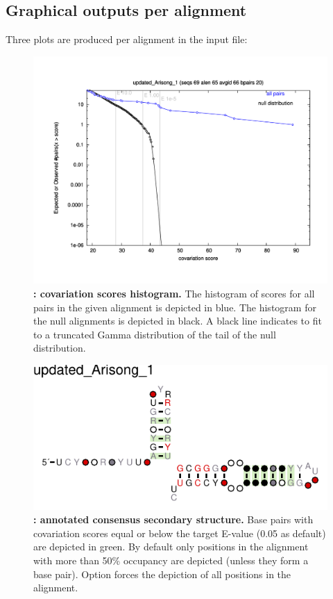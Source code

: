 \subsection{Graphical outputs per alignment}
Three plots are produced per alignment in the input file: 

\begin{figure}
  \includegraphics[scale=0.50]{Arisong_his.pdf} 
\caption{\small\textbf{:
    covariation scores histogram.}  The histogram of scores for all
  pairs in the given alignment is depicted in blue. The histogram for
  the null alignments is depicted in black. A black line indicates to
  fit to a truncated Gamma distribution of the tail of the null
  distribution.}
\label{fig:histogram}
\end{figure}

\begin{figure}
  \includegraphics[scale=1.5]{Arisong_R2R.pdf} 
\caption{\small\textbf{:
    annotated consensus secondary structure.} Base pairs with
  covariation scores equal or below the target E-value (0.05 as
  default) are depicted in green. By default only positions in the
  alignment with more than 50\% occupancy are depicted (unless they form
  a base pair). Option  forces the depiction of all
  positions in the alignment.  }
\label{fig:r2r}
\end{figure}

